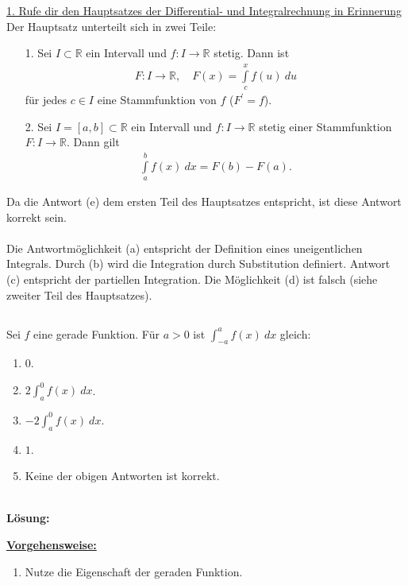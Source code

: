 \underline{1. Rufe dir den Hauptsatzes der Differential- und Integralrechnung in Erinnerung}\\
Der Hauptsatz unterteilt sich in zwei Teile:
\begin{enumerate}
	\item[1.] 
	Sei $I \subset \mathbb{R}  $ ein Intervall und $f : I \to \mathbb{R}$ stetig.
	Dann ist
	\begin{align*}
		F : I \to \mathbb{R}, \quad F(x) = \int \limits_{c}^x f(u) \ du
	\end{align*}
	für jedes $c \in I $ eine Stammfunktion von $f$ ($F^\prime = f$).
	\item[2.]
	Sei $I = [a,b] \subset \mathbb{R} $ ein Intervall und $f: I \to \mathbb{R}$ stetig einer Stammfunktion $F : I \to \mathbb{R}$. Dann gilt
	\begin{align*}
		\int \limits_a^b f(x) \ dx = F(b) - F(a).
	\end{align*}
\end{enumerate}
Da die Antwort (e) dem ersten Teil des Hauptsatzes entspricht, ist diese Antwort korrekt sein.\\
\\
Die Antwortmöglichkeit (a) entspricht der Definition eines uneigentlichen Integrals.
Durch (b) wird die Integration durch Substitution definiert. Antwort (c) entspricht der partiellen Integration. 
Die Möglichkeit (d) ist falsch (siehe zweiter Teil des Hauptsatzes). 


\newpage

\subsection*{}
Sei $ f $ eine gerade Funktion.
Für $a > 0$ ist $\int_{-a}^a f(x) \ dx$ gleich:
\renewcommand{\labelenumi}{(\alph{enumi})}
\begin{enumerate}
	\item 
	$ 0 $.
	\item
	$ 2 \int_a^0 f(x) \ dx $.
	\item
	$ -2  \int_a^0 f(x) \ dx$.
	\item
	$ 1 $.
	\item
	Keine der obigen Antworten ist korrekt.
\end{enumerate}
\ \\
\textbf{Lösung:}
\begin{mdframed}
\underline{\textbf{Vorgehensweise:}}
\renewcommand{\labelenumi}{\theenumi.}
\begin{enumerate}
\item Nutze die Eigenschaft der geraden Funktion.
\end{enumerate}
\end{mdframed}

